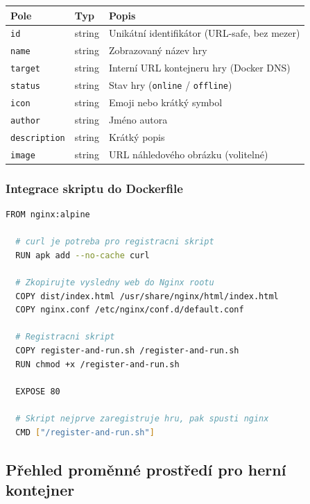 \documentclass[12pt,a4paper]{article}
\begin{document}
\begin{center}
\begin{tabular}{@{}lll@{}}
\toprule
\textbf{Pole} & \textbf{Typ} & \textbf{Popis} \\
\midrule
\texttt{id}          & string & Unikátní identifikátor (URL-safe, bez mezer) \\
\texttt{name}        & string & Zobrazovaný název hry \\
\texttt{target}      & string & Interní URL kontejneru hry (Docker DNS) \\
\texttt{status}      & string & Stav hry (\texttt{online} / \texttt{offline}) \\
\texttt{icon}        & string & Emoji nebo krátký symbol \\
\texttt{author}      & string & Jméno autora \\
\texttt{description} & string & Krátký popis \\
\texttt{image}       & string & URL náhledového obrázku (volitelné) \\
\bottomrule
\end{tabular}
\end{center}

\clearpage

\subsubsection{Integrace skriptu do Dockerfile}
\label{sec:dockerfile}

\begin{lstlisting}[language=bash, caption={Dockerfile herní aplikace (zkrácený příklad)}]
  FROM nginx:alpine

  # curl je potreba pro registracni skript
  RUN apk add --no-cache curl

  # Zkopirujte vysledny web do Nginx rootu
  COPY dist/index.html /usr/share/nginx/html/index.html
  COPY nginx.conf /etc/nginx/conf.d/default.conf

  # Registracni skript
  COPY register-and-run.sh /register-and-run.sh
  RUN chmod +x /register-and-run.sh

  EXPOSE 80

  # Skript nejprve zaregistruje hru, pak spusti nginx
  CMD ["/register-and-run.sh"]
\end{lstlisting}

\subsection{Přehled proměnné prostředí pro herní kontejner}
\end{document}
